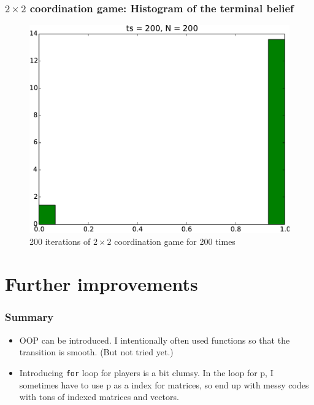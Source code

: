 \documentclass[dvipdfmx,fleqn]{beamer}
\begin{document}
\begin{frame}
\frametitle{$2\times2$ coordination game: Histogram of the terminal belief}
\begin{figure}
 \centering
 \includegraphics[width=0.7\linewidth]{2coordgame_hist200_200.pdf}
 \caption{200 iterations of $2\times2$ coordination game for 200 times}
 \label{fig:2coordgame_hist200_200}
\end{figure}
\end{frame}


\section{Further improvements}
\begin{frame}
\frametitle{Summary}
\begin{itemize}\setlength{\parskip}{0.5em}
\item
OOP can be introduced. I intentionally often used functions so that the transition is smooth. (But not tried yet.)

\item
Introducing \texttt{for} loop for players is a bit clumsy. In the loop for p, I sometimes have to use p as a index for matrices, so end up with messy codes with tons of indexed matrices and vectors. 

\end{itemize}
\end{frame}
\end{document}
